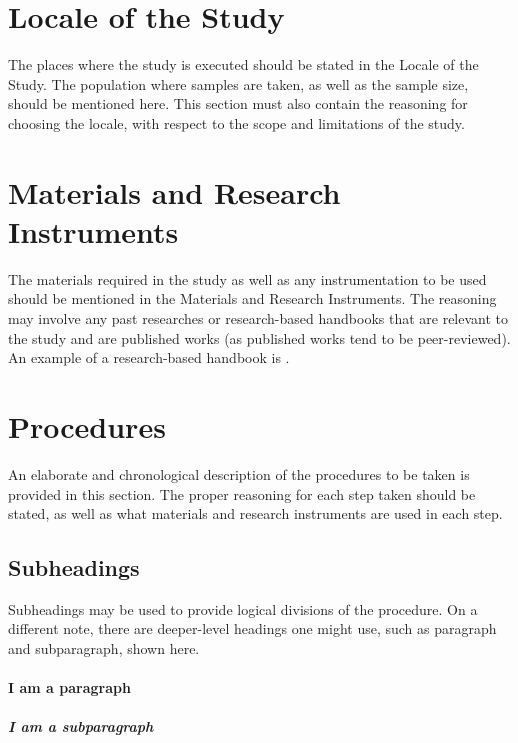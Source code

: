 \documentclass{strrespaper-trad}
\begin{document}
		\section{Locale of the Study}
			The places where the study is executed should be stated in the Locale of the Study.
			The population where samples are taken, as well as the sample size, should be mentioned here.
			This section must also contain the reasoning for choosing the locale, with respect to the scope and limitations of the study.

		\section{Materials and Research Instruments}
			The materials required in the study as well as any instrumentation to be used should be mentioned in the Materials and Research Instruments.
			The reasoning may involve any past researches or research-based handbooks that are relevant to the study and are published works (as published works tend to be peer-reviewed).
			An example of a research-based handbook is \textcite{letcherWindEnergyEngineering2017}.

		\section{Procedures}
			An elaborate and chronological description of the procedures to be taken is provided in this section.
			The proper reasoning for each step taken should be stated, as well as what materials and research instruments are used in each step.
			\subsection{Subheadings}
				Subheadings may be used to provide logical divisions of the procedure.
				On a different note, there are deeper-level headings one might use, such as paragraph and subparagraph, shown here.
				\paragraph{I am a paragraph}
					\blindtext
					\subparagraph{I am a subparagraph}
						\blindtext
\end{document}
